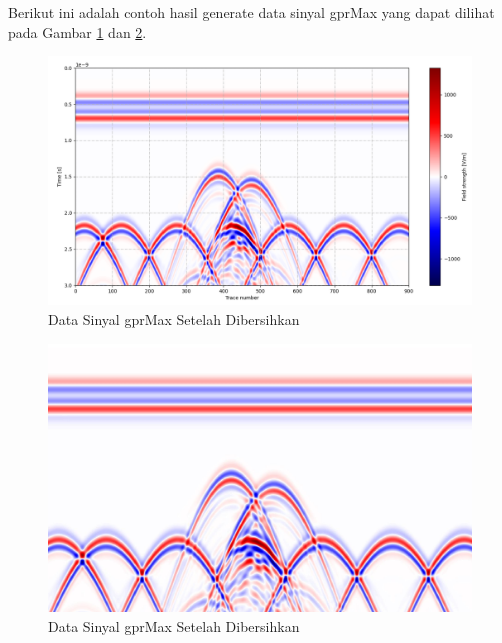 Berikut ini adalah contoh hasil generate data sinyal gprMax yang dapat dilihat pada Gambar \ref{fig:beforeclean} dan \ref{fig:afterclean}.

\begin{minipage}{\linewidth}
  \begin{figure} [H] \centering
    \includegraphics[scale=0.5]{gambar/bab3/beforeclean.png}
    \caption{Data Sinyal gprMax Setelah Dibersihkan}
    \label{fig:beforeclean}
  \end{figure}
\end{minipage}

\begin{minipage}{\linewidth}
  \begin{figure} [H] \centering
    \includegraphics[scale=0.1]{gambar/bab3/afterclean.jpg}
    \caption{Data Sinyal gprMax Setelah Dibersihkan}
    \label{fig:afterclean}
  \end{figure}
\end{minipage}

